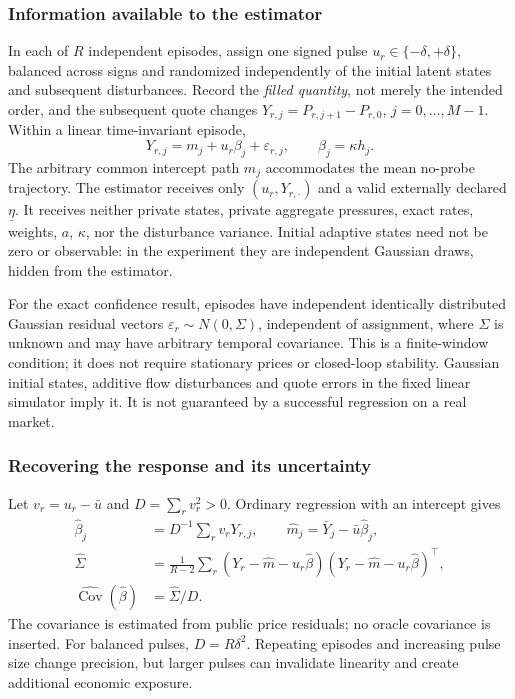 \documentclass[10pt,twocolumn,letterpaper]{article}
\theoremstyle{definition}
\theoremstyle{remark}
\begin{document}
\subsubsection{Information available to the estimator}
In each of $R$ independent episodes, assign one signed pulse $u_r\in\{-\delta,+\delta\}$, balanced across signs and randomized independently of the initial latent states and subsequent disturbances. Record the \emph{filled quantity}, not merely the intended order, and the subsequent quote changes $Y_{r,j}=P_{r,j+1}-P_{r,0}$, $j=0,\ldots,M-1$. Within a linear time-invariant episode,
\begin{equation}
 Y_{r,j}=m_j+u_r\beta_j+\varepsilon_{r,j},
 \qquad \beta_j=\kappa h_j.
 \label{eq:public_measurement}
\end{equation}
The arbitrary common intercept path $m_j$ accommodates the mean no-probe trajectory. The estimator receives only $(u_r,Y_{r,\cdot})$ and a valid externally declared $\underline\eta$. It receives neither private states, private aggregate pressures, exact rates, weights, $a$, $\kappa$, nor the disturbance variance. Initial adaptive states need not be zero or observable: in the experiment they are independent Gaussian draws, hidden from the estimator.

For the exact confidence result, episodes have independent identically distributed Gaussian residual vectors $\varepsilon_r\sim N(0,\Sigma)$, independent of assignment, where $\Sigma$ is unknown and may have arbitrary temporal covariance. This is a finite-window condition; it does not require stationary prices or closed-loop stability. Gaussian initial states, additive flow disturbances and quote errors in the fixed linear simulator imply it. It is not guaranteed by a successful regression on a real market.

\subsubsection{Recovering the response and its uncertainty}
Let $v_r=u_r-\bar u$ and $D=\sum_r v_r^2>0$. Ordinary regression with an intercept gives
\begin{align}
 \widehat\beta_j&=D^{-1}\sum_r v_rY_{r,j},\qquad
 \widehat m_j=\bar Y_j-\bar u\widehat\beta_j,\\
 \widehat\Sigma&=\frac1{R-2}\sum_r
 (Y_r-\widehat m-u_r\widehat\beta)
 (Y_r-\widehat m-u_r\widehat\beta)^\top,\\
 \widehat{\operatorname{Cov}}(\widehat\beta)&=\widehat\Sigma/D.
 \label{eq:observed_covariance}
\end{align}
The covariance is estimated from public price residuals; no oracle covariance is inserted. For balanced pulses, $D=R\delta^2$. Repeating episodes and increasing pulse size change precision, but larger pulses can invalidate linearity and create additional economic exposure.
\end{document}
